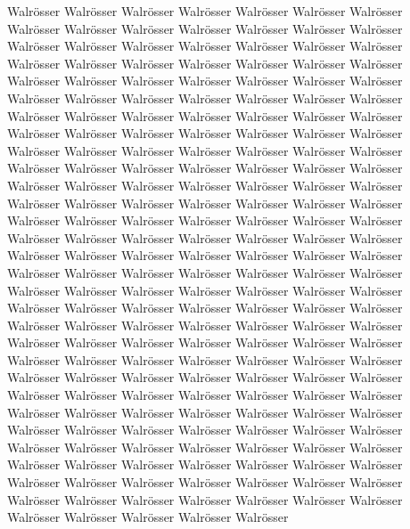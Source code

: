 \documentclass[a4paper, twoside, 12pt]{report}
\begin{document}
Walr\"osser Walr\"osser Walr\"osser Walr\"osser Walr\"osser Walr\"osser Walr\"osser Walr\"osser  Walr\"osser Walr\"osser Walr\"osser Walr\"osser Walr\"osser Walr\"osser Walr\"osser Walr\"osser Walr\"osser Walr\"osser Walr\"osser Walr\"osser Walr\"osser Walr\"osser Walr\"osser Walr\"osser Walr\"osser Walr\"osser Walr\"osser Walr\"osser Walr\"osser Walr\"osser Walr\"osser Walr\"osser Walr\"osser Walr\"osser Walr\"osser Walr\"osser Walr\"osser Walr\"osser Walr\"osser Walr\"osser Walr\"osser Walr\"osser Walr\"osser Walr\"osser Walr\"osser Walr\"osser Walr\"osser Walr\"osser Walr\"osser Walr\"osser Walr\"osser Walr\"osser Walr\"osser Walr\"osser Walr\"osser Walr\"osser Walr\"osser Walr\"osser Walr\"osser Walr\"osser Walr\"osser Walr\"osser Walr\"osser Walr\"osser Walr\"osser Walr\"osser Walr\"osser Walr\"osser Walr\"osser Walr\"osser Walr\"osser Walr\"osser Walr\"osser Walr\"osser Walr\"osser Walr\"osser Walr\"osser Walr\"osser Walr\"osser Walr\"osser Walr\"osser Walr\"osser Walr\"osser Walr\"osser Walr\"osser Walr\"osser Walr\"osser Walr\"osser Walr\"osser Walr\"osser Walr\"osser Walr\"osser Walr\"osser Walr\"osser Walr\"osser Walr\"osser Walr\"osser Walr\"osser Walr\"osser Walr\"osser Walr\"osser Walr\"osser Walr\"osser Walr\"osser Walr\"osser Walr\"osser Walr\"osser Walr\"osser  Walr\"osser Walr\"osser Walr\"osser Walr\"osser Walr\"osser Walr\"osser Walr\"osser Walr\"osser Walr\"osser Walr\"osser Walr\"osser Walr\"osser Walr\"osser Walr\"osser Walr\"osser Walr\"osser Walr\"osser Walr\"osser Walr\"osser Walr\"osser Walr\"osser Walr\"osser Walr\"osser Walr\"osser Walr\"osser Walr\"osser Walr\"osser Walr\"osser Walr\"osser Walr\"osser Walr\"osser Walr\"osser Walr\"osser Walr\"osser Walr\"osser Walr\"osser Walr\"osser Walr\"osser Walr\"osser Walr\"osser Walr\"osser Walr\"osser Walr\"osser Walr\"osser Walr\"osser Walr\"osser Walr\"osser Walr\"osser Walr\"osser Walr\"osser Walr\"osser Walr\"osser Walr\"osser Walr\"osser Walr\"osser Walr\"osser Walr\"osser Walr\"osser Walr\"osser Walr\"osser Walr\"osser Walr\"osser Walr\"osser Walr\"osser Walr\"osser Walr\"osser Walr\"osser Walr\"osser Walr\"osser Walr\"osser Walr\"osser Walr\"osser Walr\"osser Walr\"osser Walr\"osser Walr\"osser Walr\"osser Walr\"osser Walr\"osser Walr\"osser Walr\"osser Walr\"osser Walr\"osser Walr\"osser Walr\"osser Walr\"osser Walr\"osser Walr\"osser Walr\"osser Walr\"osser Walr\"osser Walr\"osser Walr\"osser Walr\"osser Walr\"osser Walr\"osser Walr\"osser Walr\"osser Walr\"osser Walr\"osser 
\end{document}
